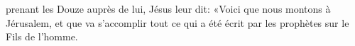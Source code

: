 \encetemps prenant les Douze auprès de lui, Jésus leur dit:
	«Voici que nous montons à Jérusalem,
	et que va s’accomplir tout ce qui a été écrit par les prophètes
		sur le Fils de l’homme.
